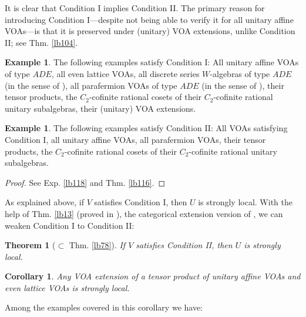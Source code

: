 \documentclass[11pt,b5paper,notitlepage]{article}
\theoremstyle{definition}
\newtheorem{eg}[df]{Example}
\theoremstyle{plain}
\newtheorem{thm}[df]{Theorem}
\newtheorem{co}[df]{Corollary}
\numberwithin{equation}{section}
\begin{document}
It is clear that Condition I implies Condition II. The primary reason for introducing Condition I---despite not being able to verify it for all unitary affine VOAs---is that it is preserved under (unitary) VOA extensions, unlike Condition II; see Thm. \ref{lb104}.



\begin{eg}\label{lb111}
The following examples satisfy Condition I: All unitary affine VOAs of type $ADE$, all even lattice VOAs, all discrete series $W$-algebras of type $ADE$ (in the sense of \cite{ACL19}), all parafermion VOAs of type $ADE$ (in the sense of \cite{DR17}), their tensor products, the $C_2$-cofinite rational cosets of their $C_2$-cofinite rational unitary subalgebras, their (unitary) VOA extensions.
\end{eg}

\begin{eg}\label{lb112}
The following examples satisfy Condition II: All VOAs satisfying Condition I, all unitary affine VOAs, all parafermion VOAs, their tensor products, the $C_2$-cofinite rational cosets of their $C_2$-cofinite rational unitary subalgebras.
\end{eg}


\begin{proof}
See Exp. \ref{lb118} and Thm. \ref{lb116}.
\end{proof}

As explained above, if $V$ satisfies Condition I, then $U$ is strongly local. With the help of Thm. \ref{lb13} (proved in \cite[Sec. 1.6]{Gui20}), the categorical extension version of \cite[Thm. 8.1]{CKLW18}, we can weaken Condition I to Condition II:

\begin{thm}[$\subset$ Thm. \ref{lb78}]\label{lb103}
If $V$ satisfies Condition II, then $U$ is strongly local.
\end{thm}



\begin{co}
Any VOA extension of a tensor product of unitary affine VOAs and even lattice VOAs is strongly local.
\end{co}

Among the examples covered in this corollary we have:
\end{document}
